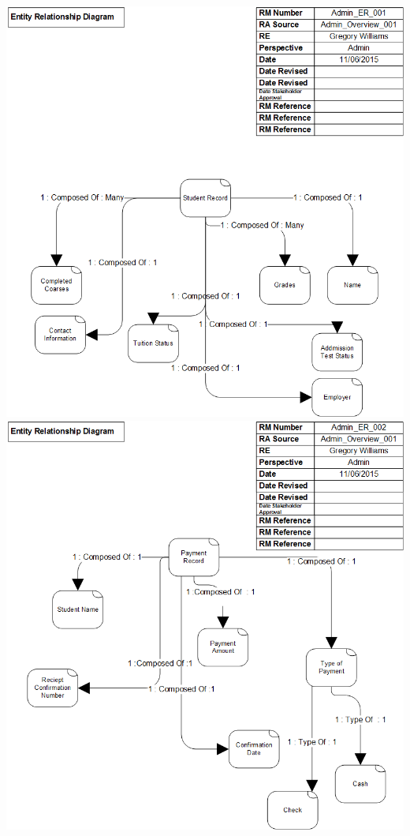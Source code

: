 \documentclass{article}
\begin{document}
	
	

	\includegraphics[width=\textwidth]{EntityRelationship}
	\\
	\includegraphics[width=\textwidth]{EntityRelationship2}
\end{document}
